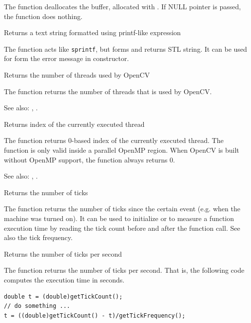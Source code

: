 The function deallocates the buffer, allocated with .
If NULL pointer is passed, the function does nothing.

Returns a text string formatted using printf-like expression

\begin{description}
\end{description}

The function acts like \texttt{sprintf}, but forms and returns STL string. It can be used for form the error message in  constructor.

Returns the number of threads used by OpenCV


The function returns the number of threads that is used by OpenCV.

See also: , .


Returns index of the currently executed thread


The function returns 0-based index of the currently executed thread. The function is only valid inside a parallel OpenMP region. When OpenCV is built without OpenMP support, the function always returns 0.

See also: , .

Returns the number of ticks


The function returns the number of ticks since the certain event (e.g. when the machine was turned on).
It can be used to initialize  or to measure a function execution time by reading the tick count before and after the function call. See also the tick frequency.

Returns the number of ticks per second


The function returns the number of ticks per second.
That is, the following code computes the execution time in seconds.
\begin{lstlisting}
double t = (double)getTickCount();
// do something ...
t = ((double)getTickCount() - t)/getTickFrequency();
\end{lstlisting}

